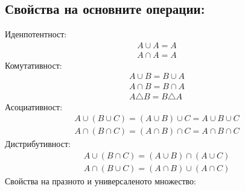 \documentclass[12pt]{article}
\begin{document}
    \subsection*{Свойства на основните операции:}
    Иденпотентност: 
    \begin{gather*}
        A \cup A = A \\
        A \cap A = A
    \end{gather*}
    Комутативност:
    \begin{gather*}
        A \cup B = B \cup A \\
        A \cap B = B \cap A \\
        A \triangle B = B \triangle A
    \end{gather*}
    Асоциативност:
    \begin{gather*}
        A \cup (B \cup C) = (A \cup B) \cup C = A \cup B \cup C \\
        A \cap (B \cap C) = (A \cap B) \cap C = A \cap B \cap C
    \end{gather*}
    Дистрибутивност:
    \begin{gather*}
        A \cup (B \cap C) = (A \cup B) \cap (A \cup C) \\
        A \cap (B \cup C) = (A \cap B) \cup (A \cap C) 
    \end{gather*}
    Свойства на празното и универсаленото множество:
    
    
\end{document}
